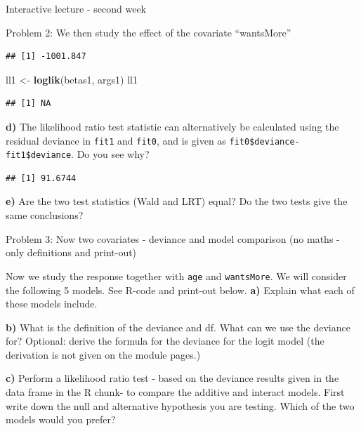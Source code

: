\documentclass[
  ignorenonframetext,
]{beamer}
\newenvironment{Shaded}{\begin{snugshade}}{\end{snugshade}}
\newcommand{\FunctionTok}[1]{\textcolor[rgb]{0.13,0.29,0.53}{\textbf{#1}}}
\newcommand{\NormalTok}[1]{#1}
\newcommand{\OtherTok}[1]{\textcolor[rgb]{0.56,0.35,0.01}{#1}}
\newcommand{\SpecialCharTok}[1]{\textcolor[rgb]{0.81,0.36,0.00}{\textbf{#1}}}
\begin{document}
\begin{frame}[fragile]{Interactive lecture - second week}
\begin{block}{Problem 2: We then study the effect of the covariate
``wantsMore''}
\begin{verbatim}
## [1] -1001.847
\end{verbatim}

\begin{Shaded}
\begin{Highlighting}[]
\NormalTok{ll1 }\OtherTok{\textless{}{-}} \FunctionTok{loglik}\NormalTok{(betas1, args1)}
\NormalTok{ll1}
\end{Highlighting}
\end{Shaded}

\begin{verbatim}
## [1] NA
\end{verbatim}

\textbf{d)} The likelihood ratio test statistic can alternatively be
calculated using the residual deviance in \texttt{fit1} and
\texttt{fit0}, and is given as \texttt{fit0\$deviance-fit1\$deviance}.
Do you see why?

\begin{Shaded}
\end{Shaded}

\begin{verbatim}
## [1] 91.6744
\end{verbatim}

\textbf{e)} Are the two test statistics (Wald and LRT) equal? Do the two
tests give the same conclusions?
\end{block}

\begin{block}{Problem 3: Now two covariates - deviance and model
comparison}
\protect\hypertarget{problem-3-now-two-covariates---deviance-and-model-comparison}{}
(no maths - only definitions and print-out)

Now we study the response together with \texttt{age} and
\texttt{wantsMore}. We will consider the following 5 models. See R-code
and print-out below. \textbf{a)} Explain what each of these models
include.

\textbf{b)} What is the definition of the deviance and df. What can we
use the deviance for? Optional: derive the formula for the deviance for
the logit model (the derivation is not given on the module pages.)

\textbf{c)} Perform a likelihood ratio test - based on the deviance
results given in the data frame in the R chunk- to compare the additive
and interact models. First write down the null and alternative
hypothesis you are testing. Which of the two models would you prefer?


\end{block}
\end{frame}
\end{document}
